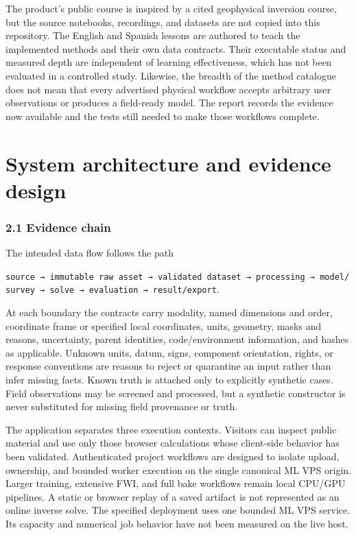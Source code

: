 The product's public course is inspired by a cited geophysical
inversion course, but the source notebooks, recordings, and datasets
are not copied into this repository. The English and Spanish lessons
are authored to teach the implemented methods and their own data
contracts. Their executable status and measured depth are independent
of learning effectiveness, which has not been evaluated in a controlled
study. Likewise, the breadth of the method catalogue does not mean that
every advertised physical workflow accepts arbitrary user observations
or produces a field-ready model. The report records the evidence now
available and the tests still needed to make those workflows complete.

\section{System architecture and evidence design}\label{system-architecture}

\subsubsection{2.1 Evidence chain}\label{evidence-chain}

The intended data flow follows the path

\texttt{source\ →\ immutable\ raw\ asset\ →\ validated\ dataset\ →\ processing\ →\ model/survey\ →\ solve\ →\ evaluation\ →\ result/export}.

At each boundary the contracts carry modality, named dimensions and
order, coordinate frame or specified local coordinates, units, geometry,
masks and reasons, uncertainty, parent identities, code/environment
information, and hashes as applicable. Unknown units, datum, signs,
component orientation, rights, or response conventions are reasons to
reject or quarantine an input rather than infer missing facts. Known
truth is attached only to explicitly synthetic cases. Field observations
may be screened and processed, but a synthetic constructor is never
substituted for missing field provenance or truth.

The application separates three execution contexts. Visitors can inspect
public material and use only those browser calculations whose
client-side behavior has been validated. Authenticated project workflows
are designed to isolate upload, ownership, and bounded worker execution
on the single canonical ML VPS origin. Larger training, extensive FWI,
and full bake workflows remain local CPU/GPU pipelines. A static or
browser replay of a saved artifact is not represented as an online
inverse solve. The specified deployment uses one bounded ML VPS service.
Its capacity and numerical job behavior have not been measured on the
live host.


